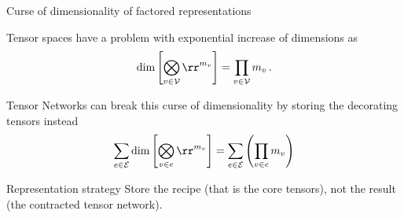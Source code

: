 \documentclass{beamer}
\begin{document}
\begin{frame}{Curse of dimensionality of factored representations}

Tensor spaces have a problem with exponential increase of dimensions as 
	\[ \mathrm{dim}\left[ 
	\bigotimes_{\node\in\nodes} \rr^{\catdimof{\node}} 
	\right] =
	\prod_{\node\in\nodes} \catdimof{\node} \, . \]


Tensor Networks can break this curse of dimensionality by storing the decorating tensors instead
\begin{align*}
	\sum_{\edge\in\edges} \mathrm{dim}\left[  \bigotimes_{\node\in\edge} \rr^{\catdimof{\node}} \right]
	= 	\sum_{\edge\in\edges}  \left(\prod_{\node\in\edge} \catdimof{\node}\right)
\end{align*}


\begin{block}{Representation strategy}
 	Store the recipe (that is the core tensors), not the result (the contracted tensor network).
\end{block}

\end{frame}
\end{document}
